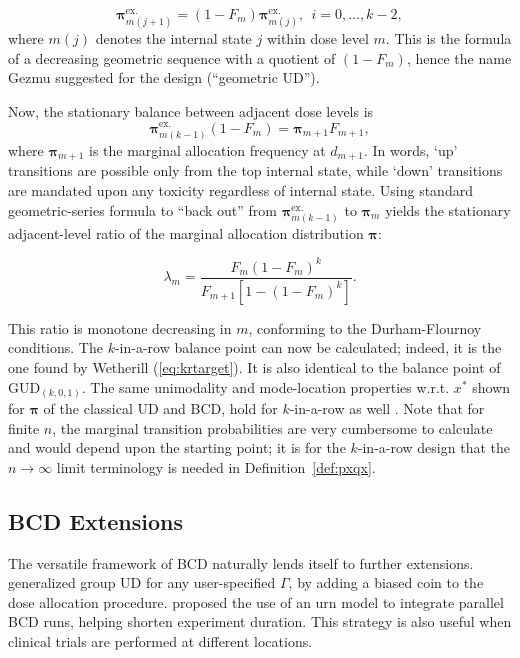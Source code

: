 \begin{equation}\label{eq:kinternal}
\boldsymbol{\pi}^{\textrm{ex.}}_{m(j+1)}=\left(1-F_m\right)\boldsymbol{\pi}^{\textrm{ex.}}_{m(j)},\ \ i=0,\ldots,k-2,
\end{equation}
\noindent where $m(j)$ denotes the internal state $j$ within dose level $m$. This is the formula of a decreasing geometric sequence with a quotient of $\left(1-F_m\right)$, hence the name Gezmu suggested for the design (``geometric UD'').

Now, the stationary balance between adjacent dose levels is
\begin{equation}\label{eq:kexternal}
\boldsymbol{\pi}^{\textrm{ex.}}_{m(k-1)}\left(1-F_m\right)=\boldsymbol{\pi}_{m+1}F_{m+1},
\end{equation}
\noindent where $\boldsymbol{\pi}_{m+1}$ is the marginal allocation frequency at $d_{m+1}$. In words, `up' transitions are possible only from the top internal state, while `down' transitions are mandated upon any toxicity regardless of internal state. Using standard geometric-series formula to ``back out'' from $\boldsymbol{\pi}^{\textrm{ex.}}_{m(k-1)}$ to $\boldsymbol{\pi}_m$ yields the stationary adjacent-level ratio of the marginal allocation distribution $\boldsymbol{\pi}$:

\begin{equation}\label{eq:krgamma}
\lambda_m=\frac{F_m\left(1-F_m\right)^{k}}{F_{m+1}\left[1-\left(1-F_m\right)^{k}\right]}.
\end{equation}

This ratio is monotone decreasing in $m$, conforming to the Durham-Flournoy conditions. The $k$-in-a-row balance point can now be calculated; indeed, it is the one found by Wetherill (\ref{eq:krtarget}). It is also identical to the balance point of GUD$_{(k,0,1)}$. The same unimodality and mode-location properties w.r.t. $x^*$ shown for $\boldsymbol{\pi}$ of the classical UD and BCD, hold for $k$-in-a-row as well \citep{Oron:Hoff:thek:2009}. Note that for finite $n$, the marginal transition probabilities are very cumbersome to calculate and would depend upon the starting point; it is for the $k$-in-a-row design that the $n\to\infty$ limit terminology is needed in Definition~\ref{def:pxqx}.

\subsection{BCD Extensions}

The versatile framework of BCD naturally lends itself to further extensions. \cite{Bald:Bort:Giov:2008} generalized group UD for any user-specified $\Gamma$, by adding a biased coin to the dose allocation procedure. \cite{Flou:aran:1998} proposed the use of an urn model to integrate parallel BCD runs, helping shorten experiment duration. This strategy is also useful when clinical trials are performed at different locations.

